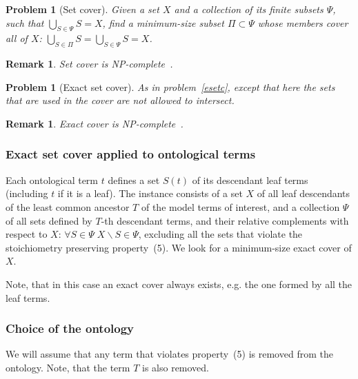 \documentclass[10pt]{bmc_article}
\newenvironment{bmcformat}{\baselineskip20pt\sloppy\setboolean{publ}{false}}{\baselineskip20pt\sloppy}
\begin{document}
\begin{bmcformat}
\newtheorem{setc}[pbm]{Problem}
\begin{setc}[Set cover]
Given a set $X$ and a collection of its finite subsets $\Psi$, such that $\bigcup_{S \in \Psi} S = X$, find a minimum-size subset $\Pi \subset \Psi$ whose members cover all of $X$: $\bigcup_{S \in \Pi} S = \bigcup_{S \in \Psi} S = X$.
\end{setc}
\newtheorem{rem}[rm]{Remark}
\begin{rem}
 Set cover is \textit{NP}-complete~\cite{Cormen2001}.
\end{rem}

\newtheorem{esetc}[pbm]{Problem}
\begin{esetc}[Exact set cover]
As in problem~\ref{esetc}, except that here the sets that are used in the cover are not allowed to intersect. 
\end{esetc}
\newtheorem{rem1}[rm]{Remark}
\begin{rem1}
Exact cover is \textit{NP}-complete~\cite{Goldreich2008}.
\end{rem1}

\subsubsection*{Exact set cover applied to ontological terms}
Each ontological term $t$ defines a set $S(t)$ of its descendant leaf terms (including $t$ if it is a leaf). The instance consists of a set $X$ of all leaf descendants of the least common ancestor $T$ of the model terms of interest, and a collection $\Psi$ of all sets defined by $T$-th descendant terms, and their relative complements with respect to $X$: $\forall S \in \Psi \; X\backslash S \in \Psi$, excluding all the sets that violate the stoichiometry preserving property~(5). We look for a minimum-size exact cover of $X$. 

Note, that in this case an exact cover always exists, e.g. the one formed by all the leaf terms.

\subsubsection*{Choice of the ontology}
We will assume that any term that violates property~(5) is removed from the ontology. Note, that the term $T$ is also removed.



\end{bmcformat}
\end{document}
